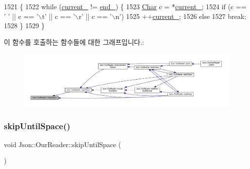 \begin{DoxyCode}
1521                            \{
1522   \textcolor{keywordflow}{while} (\hyperlink{class_json_1_1_our_reader_a5211fbbba94be80a22dd2317c621efcc}{current\_} != \hyperlink{class_json_1_1_our_reader_ab1f69b0260c27a0d2d65dc56e42c8f9d}{end\_}) \{
1523     \hyperlink{class_json_1_1_our_reader_a0cd0bab4caa66594ab843ccd5f9dc239}{Char} c = *\hyperlink{class_json_1_1_our_reader_a5211fbbba94be80a22dd2317c621efcc}{current\_};
1524     \textcolor{keywordflow}{if} (c == \textcolor{charliteral}{' '} || c == \textcolor{charliteral}{'\(\backslash\)t'} || c == \textcolor{charliteral}{'\(\backslash\)r'} || c == \textcolor{charliteral}{'\(\backslash\)n'})
1525       ++\hyperlink{class_json_1_1_our_reader_a5211fbbba94be80a22dd2317c621efcc}{current\_};
1526     \textcolor{keywordflow}{else}
1527       \textcolor{keywordflow}{break};
1528   \}
1529 \}
\end{DoxyCode}
이 함수를 호출하는 함수들에 대한 그래프입니다.\+:\nopagebreak
\begin{figure}[H]
\begin{center}
\leavevmode
\includegraphics[width=350pt]{class_json_1_1_our_reader_a6fbc6d58a4505e5ccadf330b57b17ca5_icgraph}
\end{center}
\end{figure}
\mbox{\label{class_json_1_1_our_reader_ad48bdaf5b686706f003e792fdbcbf102}} 
\subsubsection{\texorpdfstring{skip\+Until\+Space()}{skipUntilSpace()}}
{\footnotesize\ttfamily void Json\+::\+Our\+Reader\+::skip\+Until\+Space (\begin{DoxyParamCaption}{ }\end{DoxyParamCaption})\hspace{0.3cm}{\ttfamily [private]}}



